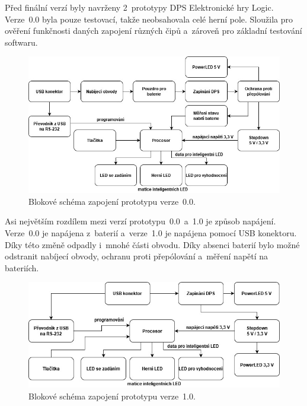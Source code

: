   Před finální verzí byly navrženy 2~prototypy DPS Elektronické hry Logic. Verze~0.0 byla pouze testovací, takže neobsahovala celé herní pole. 
  Sloužila pro ověření funkčnosti daných zapojení různých čipů a~zároveň pro základní testování softwaru.

  \begin{figure}[!h]
    \begin{center}
      \includegraphics[scale=0.5]{obrazky/v0_blokove_schema.jpg}
    \end{center}
    \caption[Blokové schéma zapojení prototypu verze~0.0]{Blokové schéma zapojení prototypu verze~0.0.}
  \end{figure}

  Asi největším rozdílem mezi verzí prototypu~0.0~a~1.0 je způsob napájení. Verze~0.0 je napájena z~baterií a~verze~1.0 je napájena pomocí USB 
  konektoru. Díky této změně 
  odpadly i~mnohé části obvodu. Díky absenci baterií bylo možné odstranit nabíjecí obvody, ochranu proti přepólování a~měření napětí 
  na bateriích. 

  \begin{figure}[!h]
    \begin{center}
      \includegraphics[scale=0.5]{obrazky/v1_blokove_schema.jpg}
    \end{center}
    \caption[Blokové schéma zapojení prototypu verze~1.0]{Blokové schéma zapojení prototypu verze~1.0.}
  \end{figure}

